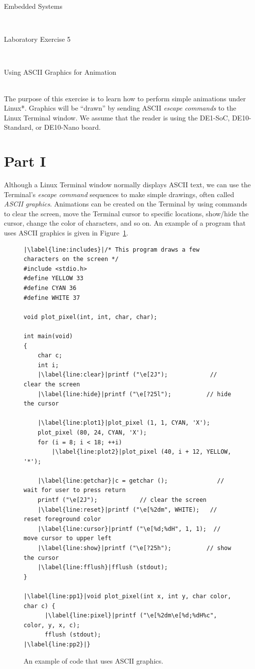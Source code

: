 \documentclass[epsfig,10pt,fullpage]{article}
\newcommand{\LabNum}{5}
\begin{document}
\centerline{\huge Embedded Systems}
~\\
\centerline{\huge Laboratory Exercise \LabNum}
~\\
\centerline{\large Using ASCII Graphics for Animation}
~\\

\noindent
The purpose of this exercise is to learn how to perform simple animations under Linux*. 
Graphics will be ``drawn'' by sending ASCII {\it escape commands} to the Linux Terminal window.
We assume that the reader is using the DE1-SoC, DE10-Standard, or DE10-Nano board.

\noindent
\section*{Part I}

\noindent
Although a Linux Terminal window normally displays ASCII text, we can use the 
Terminal's {\it escape command} sequences to make simple drawings, often called 
{\it ASCII graphics}. Animations can be created on the Terminal by using commands to 
clear the screen, move the Terminal cursor to specific locations, show/hide the cursor, 
change the color of characters, and so on. An example of a program that uses ASCII graphics is 
given in Figure~\ref{fig:dots}. 

\lstset{language=C,numbers=left,escapechar=|}
\begin{figure}[h]
\begin{center}
\begin{minipage}[t]{12.5 cm}
\begin{lstlisting}[name=dots]
|\label{line:includes}|/* This program draws a few characters on the screen */
#include <stdio.h>
#define YELLOW 33
#define CYAN 36
#define WHITE 37

void plot_pixel(int, int, char, char);

int main(void)
{
    char c;
    int i;
    |\label{line:clear}|printf ("\e[2J");            // clear the screen
    |\label{line:hide}|printf ("\e[?25l");          // hide the cursor

    |\label{line:plot1}|plot_pixel (1, 1, CYAN, 'X');
    plot_pixel (80, 24, CYAN, 'X');
    for (i = 8; i < 18; ++i)
        |\label{line:plot2}|plot_pixel (40, i + 12, YELLOW, '*');

    |\label{line:getchar}|c = getchar ();              // wait for user to press return
    printf ("\e[2J");            // clear the screen
    |\label{line:reset}|printf ("\e[%2dm", WHITE);   // reset foreground color
    |\label{line:cursor}|printf ("\e[%d;%dH", 1, 1);  // move cursor to upper left
    |\label{line:show}|printf ("\e[?25h");          // show the cursor
    |\label{line:fflush}|fflush (stdout);
}

|\label{line:pp1}|void plot_pixel(int x, int y, char color, char c) {
      |\label{line:pixel}|printf ("\e[%2dm\e[%d;%dH%c", color, y, x, c);
      fflush (stdout);
|\label{line:pp2}|}
\end{lstlisting}
\end{minipage}
\caption{An example of code that uses ASCII graphics.}
\label{fig:dots}
\end{center}
\end{figure}
\end{document}

